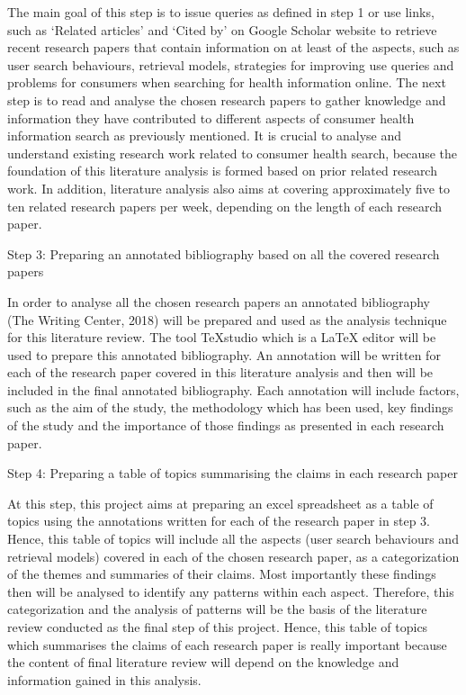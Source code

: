 \documentclass[]{article}
\begin{document}
The main goal of this step is to issue queries as defined in step 1 or use links, such as ‘Related articles’ and ‘Cited by’ on Google Scholar website to retrieve recent research papers that contain information on at least of the aspects, such as user search behaviours, retrieval models, strategies for improving use queries and problems for consumers when searching for health information online. The next step is to read and analyse the chosen research papers to gather knowledge and information they have contributed to different aspects of consumer health information search as previously mentioned. It is crucial to analyse and understand existing research work related to consumer health search, because the foundation of this literature analysis is formed based on prior related research work. In addition, literature analysis also aims at covering approximately five to ten related research papers per week, depending on the length of each research paper.             
	
Step 3: Preparing an annotated bibliography based on all the covered research papers 
	
In order to analyse all the chosen research papers an annotated bibliography (The Writing Center, 2018) will be prepared and used as the analysis technique for this literature review. The tool TeXstudio which is a LaTeX editor will be used to prepare this annotated bibliography. An annotation will be written for each of the research paper covered in this literature analysis and then will be included in the final annotated bibliography. Each annotation will include factors, such as the aim of the study, the methodology which has been used, key findings of the study and the importance of those findings as presented in each research paper. 
	
Step 4: Preparing a table of topics summarising the claims in each research paper
	
At this step, this project aims at preparing an excel spreadsheet as a table of topics using the annotations written for each of the research paper in step 3. Hence, this table of topics will include all the aspects (user search behaviours and retrieval models) covered in each of the chosen research paper, as a categorization of the themes and summaries of their claims. Most importantly these findings then will be analysed to identify any patterns within each aspect. Therefore, this categorization and the analysis of patterns will be the basis of the literature review conducted as the final step of this project.  Hence, this table of topics which summarises the claims of each research paper is really important because the content of final literature review will depend on the knowledge and information gained in this analysis. 
	
\end{document}
